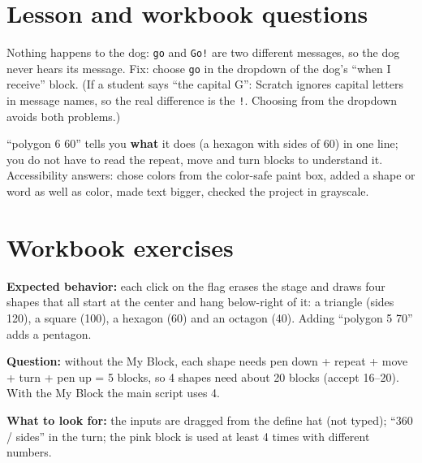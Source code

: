 
\section{Lesson and workbook questions}
\begin{answer}
Nothing happens to the dog: \texttt{go} and \texttt{Go!} are two different messages, so the dog never hears its message. Fix: choose \texttt{go} in the dropdown of the dog's \enquote{when I receive} block. (If a student says \enquote{the capital G}: Scratch ignores capital letters in message names, so the real difference is the \texttt{!}. Choosing from the dropdown avoids both problems.)
\end{answer}

\begin{answer}[Reflection]
\enquote{polygon 6 60} tells you \textbf{what} it does (a hexagon with sides of 60) in one line; you do not have to read the repeat, move and turn blocks to understand it. Accessibility answers: chose colors from the color-safe paint box, added a shape or word as well as color, made text bigger, checked the project in grayscale.
\end{answer}

\section{Workbook exercises}
\begin{answer}
\textbf{Expected behavior:} each click on the flag erases the stage and draws four shapes that all start at the center and hang below-right of it: a triangle (sides 120), a square (100), a hexagon (60) and an octagon (40). Adding \enquote{polygon 5 70} adds a pentagon.

\textbf{Question:} without the My Block, each shape needs pen down + repeat + move + turn + pen up = 5 blocks, so 4 shapes need about 20 blocks (accept 16--20). With the My Block the main script uses 4.

\textbf{What to look for:} the inputs are dragged from the define hat (not typed); \enquote{360 / sides} in the turn; the pink block is used at least 4 times with different numbers.
\end{answer}

